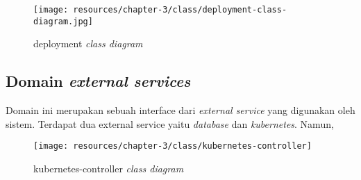 \begin{figure}[ht]
  \centering
  \texttt{[image: resources/chapter-3/class/deployment-class-diagram.jpg]}
  \caption{deployment \textit{class diagram}}
  \label{fig:deployment-class-diagram}
\end{figure}

\subsection{Domain \textit{external services}}

Domain ini merupakan sebuah interface dari \textit{external service} yang digunakan oleh sistem. Terdapat dua external service yaitu \textit{database} dan \textit{kubernetes}. Namun,

\begin{figure}[ht]
  \centering
  \texttt{[image: resources/chapter-3/class/kubernetes-controller]}
  \caption{kubernetes-controller \textit{class diagram}}
  \label{fig:kubernetes-controller-class-diagram}
\end{figure}